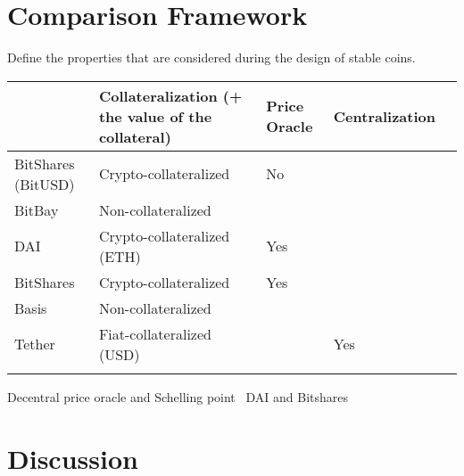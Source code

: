 \section{Comparison Framework} %
Define the properties that are considered during the design of stable coins.
~
\begin{table}[]
	\begin{tabular}{|l|l|l|l|l|}
		\hline
		& Collateralization (+ the value of the collateral) & Price Oracle & Centralization  \\ \hline
		BitShares (BitUSD) &  Crypto-collateralized &  No & \\ \hline
		BitBay & Non-collateralized & &  \\ \hline
		 DAI& Crypto-collateralized (ETH)  &  Yes& \\ \hline
		 BitShares&Crypto-collateralized&Yes&\\ \hline
		 Basis&Non-collateralized&& \\ \hline
		 Tether & Fiat-collateralized (USD) & & Yes \\ \hline
		  &&& \\ \hline
	\end{tabular}
\end{table}

Decentral price oracle and Schelling point~\cite{cryptoinsider}
DAI and Bitshares~\cite{cryptoinsider}

\section{Discussion}


